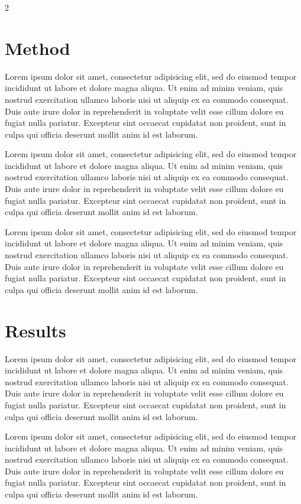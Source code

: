 \documentclass[kulak,landscape]{kulakposter}
\begin{document}
\begin{multicols}{2}
	\section*{Method}
	Lorem ipsum dolor sit amet, consectetur adipisicing elit, sed do eiusmod tempor incididunt ut labore et dolore magna aliqua. Ut enim ad minim veniam, quis nostrud exercitation ullamco laboris nisi ut aliquip ex ea commodo consequat. Duis aute irure dolor in reprehenderit in voluptate velit esse cillum dolore eu fugiat nulla pariatur. Excepteur sint occaecat cupidatat non proident, sunt in culpa qui officia deserunt mollit anim id est laborum.
	
	Lorem ipsum dolor sit amet, consectetur adipisicing elit, sed do eiusmod tempor incididunt ut labore et dolore magna aliqua. Ut enim ad minim veniam, quis nostrud exercitation ullamco laboris nisi ut aliquip ex ea commodo consequat. Duis aute irure dolor in reprehenderit in voluptate velit esse cillum dolore eu fugiat nulla pariatur. Excepteur sint occaecat cupidatat non proident, sunt in culpa qui officia deserunt mollit anim id est laborum.
	
	Lorem ipsum dolor sit amet, consectetur adipisicing elit, sed do eiusmod tempor incididunt ut labore et dolore magna aliqua. Ut enim ad minim veniam, quis nostrud exercitation ullamco laboris nisi ut aliquip ex ea commodo consequat. Duis aute irure dolor in reprehenderit in voluptate velit esse cillum dolore eu fugiat nulla pariatur. Excepteur sint occaecat cupidatat non proident, sunt in culpa qui officia deserunt mollit anim id est laborum.
	
	\columnbreak
	\section*{Results}
	Lorem ipsum dolor sit amet, consectetur adipisicing elit, sed do eiusmod tempor incididunt ut labore et dolore magna aliqua. Ut enim ad minim veniam, quis nostrud exercitation ullamco laboris nisi ut aliquip ex ea commodo consequat. Duis aute irure dolor in reprehenderit in voluptate velit esse cillum dolore eu fugiat nulla pariatur. Excepteur sint occaecat cupidatat non proident, sunt in culpa qui officia deserunt mollit anim id est laborum.
	
	Lorem ipsum dolor sit amet, consectetur adipisicing elit, sed do eiusmod tempor incididunt ut labore et dolore magna aliqua. Ut enim ad minim veniam, quis nostrud exercitation ullamco laboris nisi ut aliquip ex ea commodo consequat. Duis aute irure dolor in reprehenderit in voluptate velit esse cillum dolore eu fugiat nulla pariatur. Excepteur sint occaecat cupidatat non proident, sunt in culpa qui officia deserunt mollit anim id est laborum.
\end{multicols}
\end{document}
